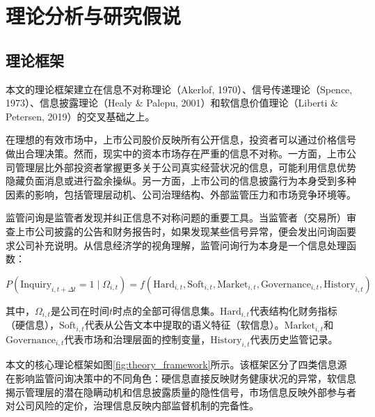 
\section{理论分析与研究假说}

\subsection{理论框架}

本文的理论框架建立在信息不对称理论（Akerlof, 1970）、信号传递理论（Spence, 1973）、信息披露理论（Healy \& Palepu, 2001）和软信息价值理论（Liberti \& Petersen, 2019）的交叉基础之上。

在理想的有效市场中，上市公司股价反映所有公开信息，投资者可以通过价格信号做出合理决策。然而，现实中的资本市场存在严重的信息不对称。一方面，上市公司管理层比外部投资者掌握更多关于公司真实经营状况的信息，可能利用信息优势隐藏负面消息或进行盈余操纵。另一方面，上市公司的信息披露行为本身受到多种因素的影响，包括管理层动机、公司治理结构、外部监管压力和市场竞争环境等。

监管问询是监管者发现并纠正信息不对称问题的重要工具。当监管者（交易所）审查上市公司披露的公告和财务报告时，如果发现某些信号异常，便会发出问询函要求公司补充说明。从信息经济学的视角理解，监管问询行为本身是一个信息处理函数：

\begin{equation}
P(\text{Inquiry}_{i,t+{\Delta t}} = 1 \mid \Omega_{i,t}) = f(\text{Hard}_{i,t}, \text{Soft}_{i,t}, \text{Market}_{i,t}, \text{Governance}_{i,t}, \text{History}_{i,t})
\label{eq:framework}
\end{equation}

其中，$\Omega_{i,t}$是公司在时间$t$时点的全部可得信息集。$\text{Hard}_{i,t}$代表结构化财务指标（硬信息），$\text{Soft}_{i,t}$代表从公告文本中提取的语义特征（软信息）。$\text{Market}_{i,t}$和$\text{Governance}_{i,t}$代表市场和治理层面的控制变量，$\text{History}_{i,t}$代表历史监管记录。

本文的核心理论框架如图\ref{fig:theory_framework}所示。该框架区分了四类信息源在影响监管问询决策中的不同角色：硬信息直接反映财务健康状况的异常，软信息揭示管理层的潜在隐瞒动机和信息披露质量的隐性信号，市场信息反映外部参与者对公司风险的定价，治理信息反映内部监督机制的完备性。

